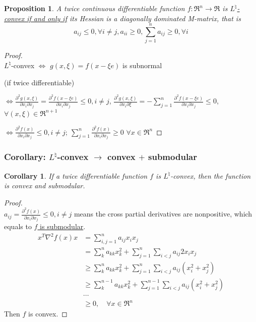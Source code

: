 \documentclass[11pt,a4paper]{article}
\newtheorem{proposition}{Proposition}
\newtheorem{corollary}{Corollary}
\begin{document}
\begin{proposition}
    A twice continuous differentiable function $f: \Re^{n} \rightarrow \Re$ is \underline{$L^\natural$-convex if and only if} its Hessian is a diagonally dominated M-matrix, that is
    $$
    a_{i j} \leq 0, \forall i \neq j, a_{i i} \geq 0, \sum_{j=1}^{n} a_{i j} \geq 0, \forall i
    $$
\end{proposition}
\begin{proof}
\quad\\

$L^\natural$-convex $\Leftrightarrow$ $g(x,\xi)=f(x-\xi e)$ is subnormal

(if twice differentiable)

$\Leftrightarrow \frac{\partial^2 g(x,\xi)}{\partial x_i\partial x_j}=\frac{\partial^2 f(x-\xi e)}{\partial x_i\partial x_j}\leq 0, i\neq j$, $\frac{\partial^2 g(x,\xi)}{\partial x_i\partial \xi}=-\sum_{j=1}^n \frac{\partial^2 f(x-\xi e)}{\partial x_i\partial x_j}\leq 0$, $\forall (x,\xi)\in \Re^{n+1}$

$\Leftrightarrow \frac{\partial^2 f(x)}{\partial x_i\partial x_j}\leq 0, i\neq j;\ \sum_{j=1}^n \frac{\partial^2 f(x)}{\partial x_i\partial x_j}\geq 0$ $\forall x\in \Re^n$
\end{proof}

\subsubsection{Corollary: $L^{\natural}$-convex $\longrightarrow$ convex $+$ submodular}
\begin{corollary}
    If a twice differentiable function $f$ is $L^{\natural}$-convex, then the function is convex and submodular.
\end{corollary}
\begin{proof}
\quad\\
\underline{$a_{i j}=\frac{\partial^2 f(x)}{\partial x_i\partial x_j} \leq 0, i\neq j$} means the cross partial derivatives are nonpositive, which equals to \underline{$f$ is submodular}.
\begin{equation}
    \begin{aligned}
        x^T\nabla^2 f(x)x&=\sum_{i, j=1}^{n} a_{i j} x_{i} x_{j}\\
        &=\sum_k^na_{kk}x_k^2+\sum_{j=1}^n\sum_{i< j}a_{ij}2x_ix_j\\
        &\geq \sum_k^na_{kk}x_k^2+\sum_{j=1}^n\sum_{i< j}a_{ij}(x_i^2+x_j^2)\\
        &\geq \sum_k^{n-1}a_{kk}x_k^2+\sum_{j=1}^{n-1}\sum_{i< j}a_{ij}(x_i^2+x_j^2)\\
        &\cdots\\
        &\geq 0,\quad \forall x\in \Re^n
    \end{aligned}
    \nonumber
\end{equation}
Then $f$ is convex.
\end{proof}
\end{document}
